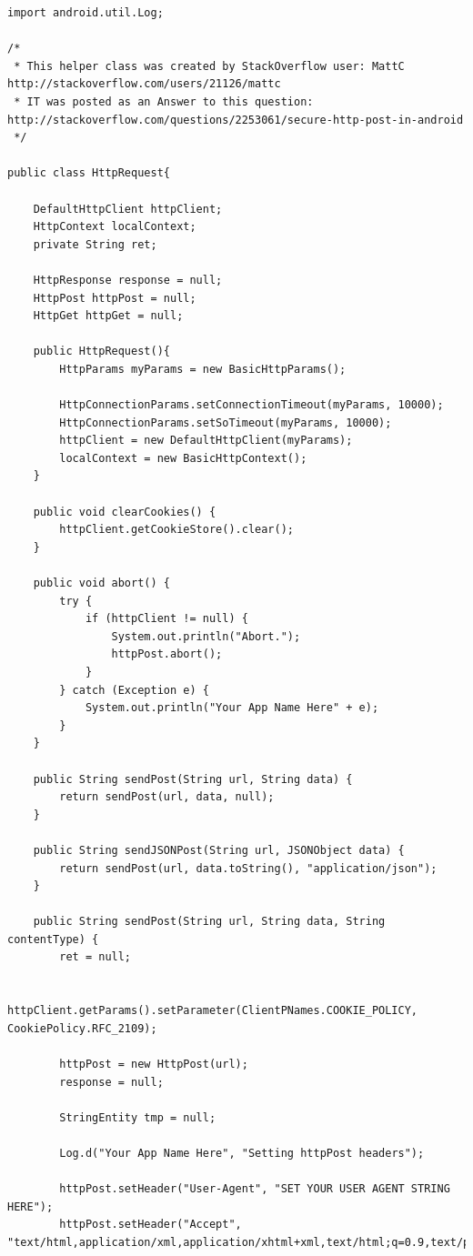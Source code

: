 \documentclass[12pt, %
openright, 
oneside,
a4paper,
brazil]{facom-ufu-abntex2}
\begin{document}
\begin{anexosenv}
\begin{lstlisting}
import android.util.Log;

/*
 * This helper class was created by StackOverflow user: MattC http://stackoverflow.com/users/21126/mattc
 * IT was posted as an Answer to this question: http://stackoverflow.com/questions/2253061/secure-http-post-in-android
 */

public class HttpRequest{

    DefaultHttpClient httpClient;
    HttpContext localContext;
    private String ret;

    HttpResponse response = null;
    HttpPost httpPost = null;
    HttpGet httpGet = null;

    public HttpRequest(){
        HttpParams myParams = new BasicHttpParams();

        HttpConnectionParams.setConnectionTimeout(myParams, 10000);
        HttpConnectionParams.setSoTimeout(myParams, 10000);
        httpClient = new DefaultHttpClient(myParams);       
        localContext = new BasicHttpContext();    
    }

    public void clearCookies() {
        httpClient.getCookieStore().clear();
    }

    public void abort() {
        try {
            if (httpClient != null) {
                System.out.println("Abort.");
                httpPost.abort();
            }
        } catch (Exception e) {
            System.out.println("Your App Name Here" + e);
        }
    }

    public String sendPost(String url, String data) {
        return sendPost(url, data, null);
    }

    public String sendJSONPost(String url, JSONObject data) {
        return sendPost(url, data.toString(), "application/json");
    }

    public String sendPost(String url, String data, String contentType) {
        ret = null;

        httpClient.getParams().setParameter(ClientPNames.COOKIE_POLICY, CookiePolicy.RFC_2109);

        httpPost = new HttpPost(url);
        response = null;

        StringEntity tmp = null;        

        Log.d("Your App Name Here", "Setting httpPost headers");

        httpPost.setHeader("User-Agent", "SET YOUR USER AGENT STRING HERE");
        httpPost.setHeader("Accept", "text/html,application/xml,application/xhtml+xml,text/html;q=0.9,text/plain;q=0.8,image/png,*;q=0.5");


\end{lstlisting}
\end{anexosenv}
\end{document}

